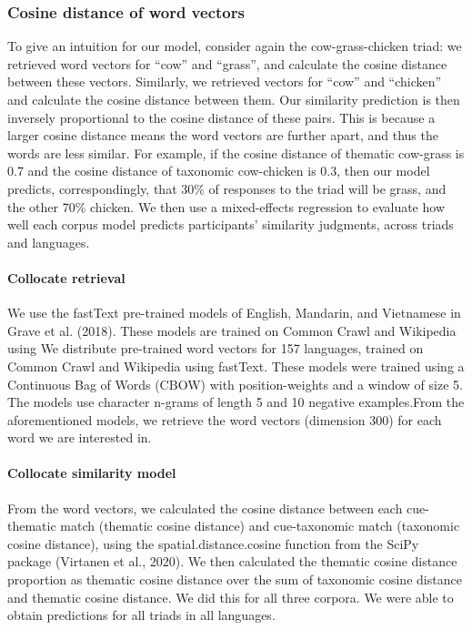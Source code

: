 \documentclass[10pt, letterpaper]{article}
\begin{document}
\hypertarget{cosine-distance-of-word-vectors}{%
\subsubsection{Cosine distance of word
vectors}\label{cosine-distance-of-word-vectors}}

To give an intuition for our model, consider again the cow-grass-chicken
triad: we retrieved word vectors for ``cow'' and ``grass'', and
calculate the cosine distance between these vectors. Similarly, we
retrieved vectors for ``cow'' and ``chicken'' and calculate the cosine
distance between them. Our similarity prediction is then inversely
proportional to the cosine distance of these pairs. This is because a
larger cosine distance means the word vectors are further apart, and
thus the words are less similar. For example, if the cosine distance of
thematic cow-grass is 0.7 and the cosine distance of taxonomic
cow-chicken is 0.3, then our model predicts, correspondingly, that 30\%
of responses to the triad will be grass, and the other 70\% chicken. We
then use a mixed-effects regression to evaluate how well each corpus
model predicts participants' similarity judgments, across triads and
languages.

\hypertarget{collocate-retrieval}{%
\paragraph{Collocate retrieval}\label{collocate-retrieval}}

We use the fastText pre-trained models of English, Mandarin, and
Vietnamese in Grave et al. (2018). These models are trained on Common
Crawl and Wikipedia using We distribute pre-trained word vectors for 157
languages, trained on Common Crawl and Wikipedia using fastText. These
models were trained using a Continuous Bag of Words (CBOW) with
position-weights and a window of size 5. The models use character
n-grams of length 5 and 10 negative examples.From the aforementioned
models, we retrieve the word vectors (dimension 300) for each word we
are interested in.

\hypertarget{collocate-similarity-model-1}{%
\paragraph{Collocate similarity
model}\label{collocate-similarity-model-1}}

From the word vectors, we calculated the cosine distance between each
cue-thematic match (thematic cosine distance) and cue-taxonomic match
(taxonomic cosine distance), using the spatial.distance.cosine function
from the SciPy package (Virtanen et al., 2020). We then calculated the
thematic cosine distance proportion as thematic cosine distance over the
sum of taxonomic cosine distance and thematic cosine distance. We did
this for all three corpora. We were able to obtain predictions for all
triads in all languages.
\end{document}

